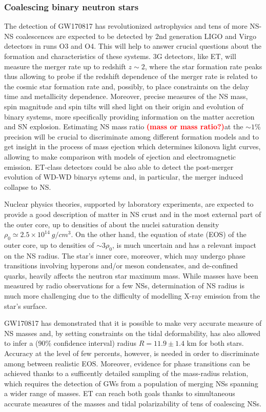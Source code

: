 \subsubsection{Coalescing binary neutron stars}
The detection of GW170817 has revolutionized astrophysics and tens of more NS-NS coalescences are expected to be detected by 2nd generation LIGO and Virgo detectors in runs O3 and O4. This will help to answer crucial questions about the formation and characteristics of these systems. 3G detectors, like ET, will measure the merger rate up to redshift $z\sim 2$, where the star formation rate peaks thus allowing to probe if the redshift dependence of the merger rate is related to the cosmic star formation rate and, possibly, to place constraints on the delay time and metallicity dependence. Moreover, precise measures of the NS mass, spin magnitude and spin tilts will shed light on their origin and evolution of binary systems, more specifically providing information on the matter accretion and SN explosion. Estimating NS mass ratio {\bf \textcolor{red}{(mass or mass ratio?)}}at the $\sim 1$\% precision will be crucial to discriminate among different formation models and to get insight in the process of mass ejection which determines kilonova light curves, allowing to make comparison with models of ejection and electromagnetic emission. ET-class detectors could be also able to detect the post-merger evolution of WD-WD binarys sytems and, in particular, the merger induced collapse to NS.   

Nuclear physics theories, supported by laboratory experiments, are expected to provide a good description of matter in NS crust and in the most external part of the outer core, up to densities of about the nuclei saturation density $\rho_0 \simeq 2.5\times 10^{14}~g/cm^3$. On the other hand, the equation of state (EOS) of the outer core, up to densities of $\sim 3\rho_0$, is much uncertain and has a relevant impact on the NS radius. The star's inner core, moreover, which may undergo phase transitions involving hyperons and/or meson condensates, and de-confined quarks, heavily affects the neutron star maximum mass. While masses have been measured by radio observations for a few NSs, determination of NS radius is much more challenging due to the difficulty of modelling X-ray emission from the star's surface. 

GW170817 has demonstrated that it is possible to make very accurate measure of NS masses and, by setting constraints on the tidal deformability, has also allowed to infer a (90\% confidence interval) radius $R=11.9\pm 1.4$ km for both stars. Accuracy at the level of few percents, however, is needed in order to discriminate among between realistic EOS. Moreover, evidence for phase transitions can be achieved thanks to a sufficently detailed sampling of the mass-radius relation, which requires the detection of GWs from a population of merging NSs spanning a wider range of masses. ET can reach both goals thanks to simultaneous accurate measures of the masses and tidal polarizability of tens of coalescing NSs. 

